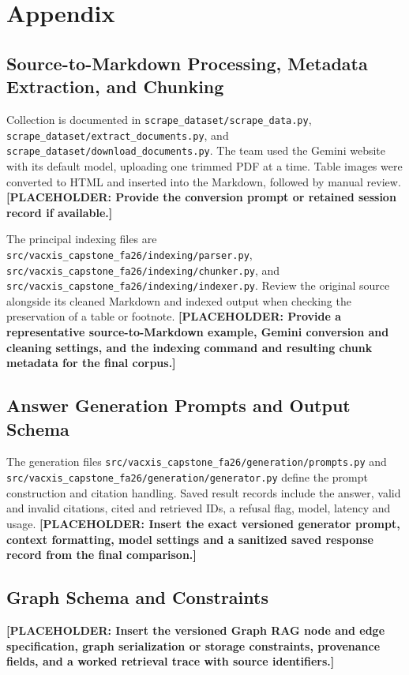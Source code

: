 \documentclass[oneside]{sn-jnl}
\newcommand{\pending}[1]{\textbf{\textcolor{red!65!black}{[PLACEHOLDER: #1]}}}
\newcommand{\artifact}[1]{\nolinkurl{#1}}
\begin{document}



\appendix
\section*{Appendix}

\subsection{Source-to-Markdown Processing, Metadata Extraction, and Chunking}
Collection is documented in \artifact{scrape_dataset/scrape_data.py}, \artifact{scrape_dataset/extract_documents.py}, and \artifact{scrape_dataset/download_documents.py}. The team used the Gemini website with its default model, uploading one trimmed PDF at a time. Table images were converted to HTML and inserted into the Markdown, followed by manual review. \pending{Provide the conversion prompt or retained session record if available.}

The principal indexing files are \artifact{src/vacxis_capstone_fa26/indexing/parser.py}, \artifact{src/vacxis_capstone_fa26/indexing/chunker.py}, and \artifact{src/vacxis_capstone_fa26/indexing/indexer.py}. Review the original source alongside its cleaned Markdown and indexed output when checking the preservation of a table or footnote.
\pending{Provide a representative source-to-Markdown example, Gemini conversion and cleaning settings, and the indexing command and resulting chunk metadata for the final corpus.}

\subsection{Answer Generation Prompts and Output Schema}
The generation files \artifact{src/vacxis_capstone_fa26/generation/prompts.py} and \artifact{src/vacxis_capstone_fa26/generation/generator.py} define the prompt construction and citation handling. Saved result records include the answer, valid and invalid citations, cited and retrieved IDs, a refusal flag, model, latency and usage.
\pending{Insert the exact versioned generator prompt, context formatting, model settings and a sanitized saved response record from the final comparison.}

\subsection{Graph Schema and Constraints}
\pending{Insert the versioned Graph RAG node and edge specification, graph serialization or storage constraints, provenance fields, and a worked retrieval trace with source identifiers.}
\end{document}
